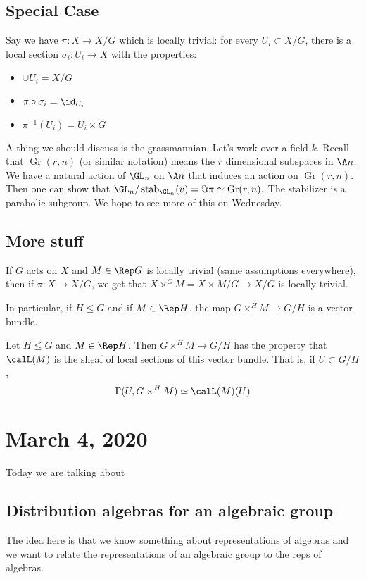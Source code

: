 \documentclass[12pt]{article}
\begin{document}
\subsection{Special Case}
Say we have $\pi:X\to X/G$ which is locally trivial: for every $U_i\subset X/G$, there is a local section $\sigma_i:U_i\to X$ with 
the properties:
\begin{itemize}
	\item $\cup U_i=X/G$
	\item $\pi\circ\sigma_i=\id_{U_i}$
	\item $\pi^{-1}(U_i)=U_i\times G$
\end{itemize}
A thing we should discuss is the grassmannian. Let's work over a field $k$. Recall that $\operatorname{Gr}(r,n)$ (or similar notation) means the 
$r$ dimensional subspaces in $\A n$. We have a natural action of $\GL_n$ on $\A n$ that induces an action on $\operatorname{Gr}(r,n)$. Then one can show that 
$\GL_n/\operatorname{stab}_{\GL_n}(v)=\Im\pi\simeq\operatorname{Gr}(r,n).$ The stabilizer is a parabolic subgroup. We hope to see more of this 
on Wednesday.

\subsection{More stuff}
\begin{thm}
	If $G$ acts on $X$ and $M\in \Rep G$ is locally trivial (same assumptions everywhere), then if $\pi:X\to X/G$,
	we get that $X\times^G M= X\times M/G\to X/G$ is locally trivial.
\end{thm}
\begin{rmk}
	In particular, if $H\le G$ and if $M\in \Rep H$, the map $G\times^H M\to G/H$ is a vector bundle.
\end{rmk}
\begin{thm}
	Let $H\le G$ and $M\in \Rep H$. Then $G\times ^H M\to G/H$ has the property that $\calL(M)$ is the sheaf of local sections of this vector bundle. That 
	is, if $U\subset G/H$,
	\[\Gamma(U,G\times^H M)\simeq \calL(M)(U)\]
\end{thm}

\section{March 4, 2020}
Today we are talking about 
\subsection{Distribution algebras for an algebraic group}
The idea here is that we know something about representations of algebras and we want to relate
the representations of an algebraic group to the reps of algebras.
\end{document}
